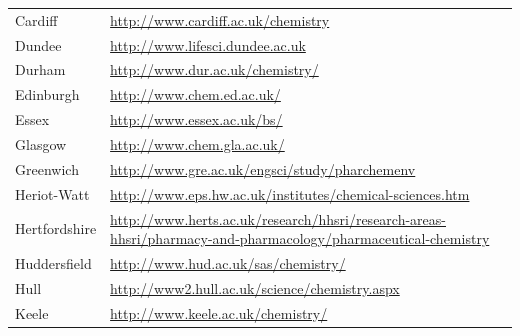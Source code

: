\begin{table}
\begin{tabular}{||l|l}
 Cardiff                            & \url{http://www.cardiff.ac.uk/chemistry}                                                                                                   \\
 Dundee                             & \url{http://www.lifesci.dundee.ac.uk}                                                                                                      \\
 Durham                             & \url{http://www.dur.ac.uk/chemistry/}                                                                                                      \\
 Edinburgh                          & \url{http://www.chem.ed.ac.uk/}                                                                                                            \\
 Essex                              & \url{http://www.essex.ac.uk/bs/}                                                                                                           \\
 Glasgow                            & \url{http://www.chem.gla.ac.uk/}                                                                                                           \\
 Greenwich                          & \url{http://www.gre.ac.uk/engsci/study/pharchemenv}                                                                                        \\
 Heriot-Watt                        & \url{http://www.eps.hw.ac.uk/institutes/chemical-sciences.htm}                                                                             \\
 Hertfordshire                      & \url{http://www.herts.ac.uk/research/hhsri/research-areas-hhsri/pharmacy-and-pharmacology/pharmaceutical-chemistry}                        \\
 Huddersfield                       & \url{http://www.hud.ac.uk/sas/chemistry/}                                                                                                  \\
 Hull                               & \url{http://www2.hull.ac.uk/science/chemistry.aspx}                                                                                        \\
 Keele                              & \url{http://www.keele.ac.uk/chemistry/}                                                                                                    \\

\end{tabular}
\end{table}

